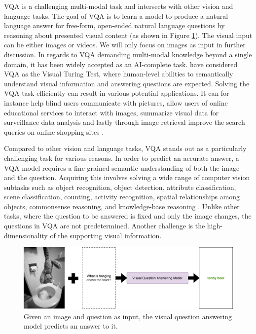 \documentclass{article}
\begin{document}
VQA is a challenging multi-modal task and intersects with other vision and language tasks. The goal of VQA is to learn a model to produce a natural language answer for free-form, open-ended natural language questions by reasoning about presented visual content (as shown in Figure \ref{fig:vqa-graph}). The visual input can be either images or videos. We will only focus on images as input in further discussion. In regards to VQA demanding multi-modal knowledge beyond a single domain, it has been widely accepted as an AI-complete task. \citet{geman2015visual} have considered VQA as the Visual Turing Test, where human-level abilities to semantically understand visual information and answering questions are expected. Solving the VQA task efficiently can result in various potential applications. It can for instance help blind users communicate with pictures, allow users of online educational services to interact with images, summarize visual data for surveillance data analysis and lastly through image retrieval improve the search queries on online shopping sites \citep{manmadhan2020vqa}.

Compared to other vision and language tasks, VQA stands out as a particularly challenging task for various reasons. In order to predict an accurate answer, a VQA model requires a fine-grained semantic understanding of both the image and the question. Acquiring this involves solving a wide range of computer vision subtasks such as object recognition, object detection, attribute classification, scene classification, counting, activity recognition, spatial relationships among objects, commonsense reasoning, and knowledge-base reasoning \citep{manmadhan2020vqa}. Unlike other tasks, where the question to be answered is fixed and only the image changes, the questions in VQA are not predetermined. Another challenge is the high-dimensionality of the supporting visual information.

\begin{figure}[H]
	\centering
	\includegraphics[width=\linewidth]{vqa_graph.pdf}
	\caption{Given an image and question as input, the visual question answering model predicts an answer to it.}
	\label{fig:vqa-graph}
\end{figure}
\end{document}
